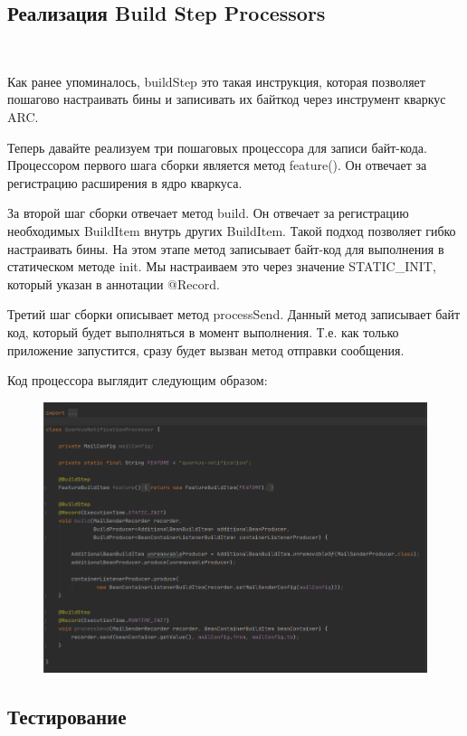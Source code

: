 \documentclass[russian,11pt]{article}
\begin{document}
\subsection{Реализация Build Step Processors}
~

Как ранее упоминалось, buildStep это такая инструкция, которая позволяет пошагово настраивать бины и записивать их байткод через инструмент кваркус ARC.

	Теперь давайте реализуем три пошаговых процессора для записи байт-кода. 
Процессором первого шага сборки является метод feature(). Он отвечает за регистрацию расширения в ядро кваркуса.

	За второй шаг сборки отвечает метод build. Он отвечает за регистрацию необходимых BuildItem внутрь других BuildItem. Такой подход позволяет гибко настраивать бины. На этом этапе метод записывает байт-код для выполнения в статическом методе init. Мы настраиваем это через значение STATIC\_INIT, который указан в аннотации @Record.

	Третий шаг сборки описывает метод processSend. Данный метод записывает байт код, который будет выполняться в момент выполнения. Т.е. как только приложение запустится, сразу будет вызван метод отправки сообщения. 


\newpage
Код процессора выглядит следующим образом:

\begin{figure}[H]
	\centering
	\includegraphics[width=\textwidth]{10}
\end{figure}

\newpage
\subsection{Тестирование}
~
\end{document}
